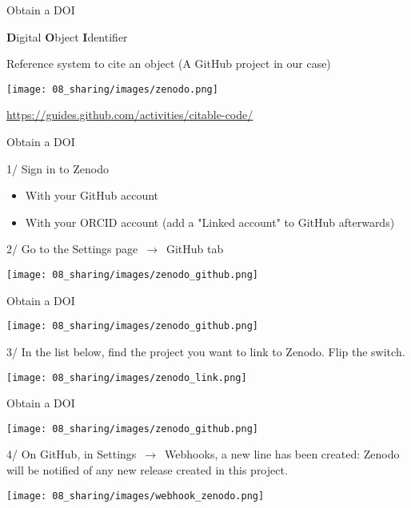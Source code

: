 \begin{frame}{Obtain a DOI}

\textbf{D}igital \textbf{O}bject \textbf{I}dentifier

Reference system to cite an object (A GitHub project in our case)

\begin{center}
    \texttt{[image: 08\_sharing/images/zenodo.png]}
\end{center}

\url{https://guides.github.com/activities/citable-code/}
\end{frame}

\begin{frame}{Obtain a DOI}

1/ Sign in to Zenodo

\begin{itemize}
    \item With your GitHub account
    \item With your ORCID account (add a "Linked account" to GitHub afterwards)
\end{itemize}

2/ Go to the Settings page $\,\to\,$ GitHub tab

\begin{center}
    \texttt{[image: 08\_sharing/images/zenodo\_github.png]}
\end{center}


\end{frame}

\begin{frame}{Obtain a DOI}

{\centering\texttt{[image: 08\_sharing/images/zenodo\_github.png]}\par }

3/ In the list below, find the project you want to link to Zenodo. Flip the switch.

\begin{center}
    \texttt{[image: 08\_sharing/images/zenodo\_link.png]}
\end{center}

\end{frame}

\begin{frame}{Obtain a DOI}

{\centering\texttt{[image: 08\_sharing/images/zenodo\_github.png]}\par }

4/ On GitHub, in Settings $\,\to\,$ Webhooks, a new line has been created: Zenodo will be notified of any new release created in this project.

\begin{center}
    \texttt{[image: 08\_sharing/images/webhook\_zenodo.png]}
\end{center}

\end{frame}

